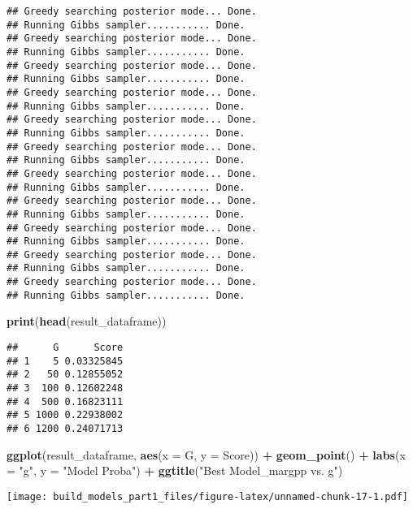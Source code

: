 \documentclass[
]{article}
\newenvironment{Shaded}{\begin{snugshade}}{\end{snugshade}}
\newcommand{\AttributeTok}[1]{\textcolor[rgb]{0.13,0.29,0.53}{#1}}
\newcommand{\FunctionTok}[1]{\textcolor[rgb]{0.13,0.29,0.53}{\textbf{#1}}}
\newcommand{\NormalTok}[1]{#1}
\newcommand{\SpecialCharTok}[1]{\textcolor[rgb]{0.81,0.36,0.00}{\textbf{#1}}}
\newcommand{\StringTok}[1]{\textcolor[rgb]{0.31,0.60,0.02}{#1}}
\begin{document}
\begin{verbatim}
## Greedy searching posterior mode... Done.
## Running Gibbs sampler........... Done.
## Greedy searching posterior mode... Done.
## Running Gibbs sampler........... Done.
## Greedy searching posterior mode... Done.
## Running Gibbs sampler........... Done.
## Greedy searching posterior mode... Done.
## Running Gibbs sampler........... Done.
## Greedy searching posterior mode... Done.
## Running Gibbs sampler........... Done.
## Greedy searching posterior mode... Done.
## Running Gibbs sampler........... Done.
## Greedy searching posterior mode... Done.
## Running Gibbs sampler........... Done.
## Greedy searching posterior mode... Done.
## Running Gibbs sampler........... Done.
## Greedy searching posterior mode... Done.
## Running Gibbs sampler........... Done.
## Greedy searching posterior mode... Done.
## Running Gibbs sampler........... Done.
## Greedy searching posterior mode... Done.
## Running Gibbs sampler........... Done.
\end{verbatim}

\begin{Shaded}
\begin{Highlighting}[]
\FunctionTok{print}\NormalTok{(}\FunctionTok{head}\NormalTok{(result\_dataframe))}
\end{Highlighting}
\end{Shaded}

\begin{verbatim}
##      G      Score
## 1    5 0.03325845
## 2   50 0.12855052
## 3  100 0.12602248
## 4  500 0.16823111
## 5 1000 0.22938002
## 6 1200 0.24071713
\end{verbatim}

\begin{Shaded}
\begin{Highlighting}[]
\FunctionTok{ggplot}\NormalTok{(result\_dataframe, }\FunctionTok{aes}\NormalTok{(}\AttributeTok{x =}\NormalTok{ G, }\AttributeTok{y =}\NormalTok{ Score)) }\SpecialCharTok{+}
\FunctionTok{geom\_point}\NormalTok{() }\SpecialCharTok{+}
\FunctionTok{labs}\NormalTok{(}\AttributeTok{x =} \StringTok{"g"}\NormalTok{, }\AttributeTok{y =} \StringTok{"Model Proba"}\NormalTok{) }\SpecialCharTok{+}
\FunctionTok{ggtitle}\NormalTok{(}\StringTok{"Best Model\_margpp vs. g"}\NormalTok{)}
\end{Highlighting}
\end{Shaded}

\texttt{[image: build\_models\_part1\_files/figure-latex/unnamed-chunk-17-1.pdf]}
\end{document}
